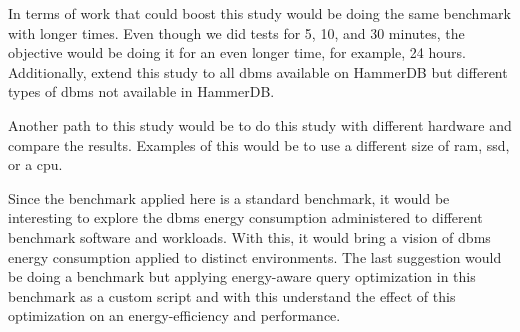 In terms of work that could boost this study would be doing the same benchmark with longer times. Even though we did tests for 5, 10, and 30 minutes, the objective would be doing it for an even longer time, for example, 24 hours. Additionally, extend this study to all \gls{dbms} available on HammerDB but different types of \gls{dbms} not available in HammerDB.

Another path to this study would be to do this study with different hardware and compare the results. Examples of this would be to use a different size of \gls{ram}, \acrshort{ssd}, or a \gls{cpu}.

Since the benchmark applied here is a standard benchmark, it would be interesting to explore the \gls{dbms} energy consumption administered to different benchmark software and workloads. With this, it would bring a vision of \gls{dbms} energy consumption applied to distinct environments. The last suggestion would be doing a benchmark but applying energy-aware query optimization in this benchmark as a custom script and with this understand the effect of this optimization on an energy-efficiency and performance.

